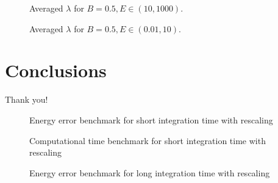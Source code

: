 \documentclass{beamer}
\begin{document}
\begin{frame}
	\begin{figure}
		
		\caption{Averaged \(\lambda\) for \(B=0.5, E \in (10, 1000)\).}
	\end{figure}
\end{frame}


\begin{frame}
	\begin{figure}
		
		\caption{Averaged \(\lambda\) for \(B=0.5, E \in (0.01, 10)\).}
	\end{figure}
\end{frame}


\section{Conclusions}

\begin{frame}[standout]
Thank you!
\end{frame}

\appendix


\begin{frame}
	\begin{figure}
		
		\caption{Energy error benchmark for short integration time with rescaling}
	\end{figure}
\end{frame}


\begin{frame}
	\begin{figure}
		
		\caption{Computational time benchmark for short integration time with rescaling}
	\end{figure}
\end{frame}


\begin{frame}
	\begin{figure}
		
		\caption{Energy error benchmark for long integration time with rescaling}
	\end{figure}
\end{frame}
\end{document}
